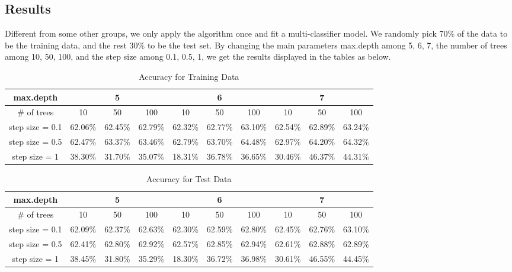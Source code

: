 \documentclass{article}
\begin{document}
\begin{spacing}{1}
\begin{large}
\subsection{Results} 

\noindent \indent Different from some other groups, we only apply the algorithm once and fit a multi-classifier model. We randomly pick 70\% of the data to be the training data, and the rest 30\% to be the test set. By changing the main parameters \cite{xg3} max.depth among 5, 6, 7, the number of trees among 10, 50, 100, and the step size among 0.1, 0.5, 1, we get the results displayed in the tables as below.
\begin{table}[h]
\centering
\caption{Accuracy for Training Data}
\label{Accuracy for Training Data}
\begin{tabular}{cccccccccc}
\hline
max.depth       & \multicolumn{3}{c}{5} & \multicolumn{3}{c}{6} & \multicolumn{3}{c}{7} \\ \hline
\# of trees     & 10    & 50    & 100   & 10  & 50       & 100  & 10    & 50    & 100   \\
step size = 0.1 & 62.06\%    & 62.45\%     & 62.79\%     & 62.32\%    & 62.77\%         & 63.10\%      & 62.54\%     & 62.89\%      & 63.24\%      \\
step size = 0.5 & 62.47\%    & 63.37\%       & 63.46\%      & 62.79\%   & 63.70\%  & 64.48\%     & 62.97\%       & 64.20\%      & 64.32\%      \\
step size = 1   &38.30\%       & 31.70\%      &35.07\%       &18.31\%     & 36.78\%         &36.65\%      &30.46\%       &46.37\%       &44.31\%       \\ \hline
\end{tabular}
\end{table}

\begin{table}[h]
\centering
\caption{Accuracy for Test Data}
\label{Accuracy for Test Data}
\begin{tabular}{cccccccccc}
\hline
max.depth       & \multicolumn{3}{c}{5} & \multicolumn{3}{c}{6} & \multicolumn{3}{c}{7} \\ \hline
\# of trees     & 10    & 50    & 100   & 10  & 50       & 100  & 10    & 50    & 100   \\
step size = 0.1 & 62.09\%      & 62.37\%     & 62.63\%      &62.30\%     & 62.59\%       & 62.80\%      & 62.45\%      & 62.76\%      & 63.10\%      \\
step size = 0.5 & 62.41\%     & 62.80\%     & 62.92\%      & 62.57\%    &62.85\%     & 62.94\%   & 62.61\%      & 62.88\%      & 62.89\%      \\
step size = 1   &38.45\%       & 31.80\%      & 35.29\%      &18.30\%     & 36.72\%         &  36.98\% &30.61\%       &46.55\%      &44.45\%     \\ \hline
\end{tabular}
\end{table}


\end{large}
\end{spacing}
\end{document}
